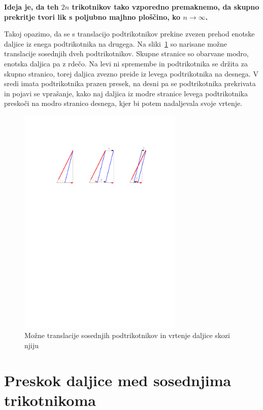 \documentclass[a4paper, 12pt]{article}
\begin{document}
\textbf{Ideja je, da teh $ 2n $ trikotnikov tako vzporedno premaknemo, da skupno prekritje tvori lik s poljubno majhno ploščino, ko $ n \to \infty $.}

Takoj opazimo, da se s translacijo podtrikotnikov prekine zvezen prehod enotske daljice iz enega podtrikotnika na drugega. Na sliki~\ref{preskok1} so narisane možne translacije sosednjih dveh podtrikotnikov. Skupne stranice so obarvane modro, enotska daljica pa z rdečo. Na levi ni spremembe in podtrikotnika se držita za skupno stranico, torej daljica zvezno preide iz levega podtrikotnika na desnega. V sredi imata podtrikotnika prazen presek, na desni pa se podtrikotnika prekrivata in pojavi se vprašanje, kako naj daljica iz modre stranice levega podtrikotnika preskoči na modro stranico desnega, kjer bi potem nadaljevala svoje vrtenje.

\begin{figure}[h!]
    \centering
    \includegraphics[width=0.7\textwidth]{ipe_slike/preskok1.pdf}
    \caption{Možne translacije sosednjih podtrikotnikov in vrtenje daljice skozi njiju}
    \label{preskok1}
\end{figure}


\section*{Preskok daljice med sosednjima trikotnikoma}
\end{document}
